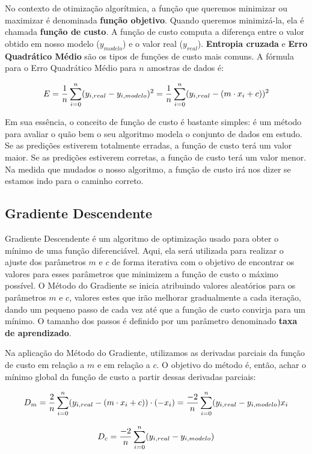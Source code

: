 No contexto de otimização algorítmica, a função que queremos minimizar ou maximizar é denominada \textbf{função objetivo}. Quando queremos minimizá-la, ela é chamada \textbf{função de custo}. A função de custo computa a diferença entre o valor obtido em nosso modelo ($y_{modelo}$) e o valor real ($y_{real}$). \textbf{Entropia cruzada} e \textbf{Erro Quadrático Médio} são os tipos de funções de custo mais comuns. A fórmula para o Erro Quadrático Médio para $n$ amostras de dados é:

\[\large E=\frac{1}{n}\sum_{i=0}^{n}(y_{i,real} - y_{i,modelo})^{2} = \frac{1}{n}\sum_{i=0}^{n}(y_{i,real} - (m \cdot x_{i} + c))^{2}\]

Em sua essência, o conceito de função de custo é bastante simples: é um método para avaliar o quão bem o seu algoritmo modela o conjunto de dados em estudo. Se as predições estiverem totalmente erradas, a função de custo terá um valor maior. Se as predições estiverem corretas, a função de custo terá um valor menor. Na medida que mudados o nosso algoritmo, a função de custo irá nos dizer se estamos indo para o caminho correto.

\subsection{Gradiente Descendente}
Gradiente Descendente é um algoritmo de optimização usado para obter o mínimo de uma função diferenciável. Aqui, ela será utilizada para realizar o ajuste dos parâmetros $m$ e $c$ de forma iterativa com o objetivo de encontrar os valores para esses parâmetros que minimizem a função de custo o máximo possível. O Método do Gradiente se inicia atribuindo valores aleatórios para os parâmetros $m$ e $c$, valores estes que irão melhorar gradualmente a cada iteração, dando um pequeno passo de cada vez até que a função de custo convirja para um mínimo. O tamanho dos passos é definido por um parâmetro denominado \textbf{taxa de aprendizado}.

Na aplicação do Método do Gradiente, utilizamos as derivadas parciais da função de custo em relação a $m$ e em relação a $c$. O objetivo do método é, então, achar o mínimo global da função de custo a partir dessas derivadas parciais:

\[\large D_{m} = \frac{2}{n}\sum_{i=0}^{n}(y_{i,real} - (m \cdot x_{i} + c))\cdot(-x_{i}) = \frac{-2}{n}\sum_{i=0}^{n}(y_{i,real} - y_{i,modelo})x_{i}\]

\[\large D_{c} = \frac{-2}{n}\sum_{i=0}^{n}(y_{i,real} - y_{i,modelo})\]

